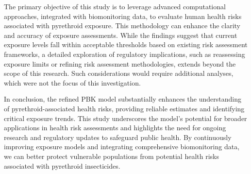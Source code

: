\documentclass[toxics,article,submit,pdftex,moreauthors]{Definitions/mdpi}
\begin{document}
The primary objective of this study is to leverage advanced computational
approaches, integrated with biomonitoring data, to evaluate human health risks
associated with pyrethroid exposure. This methodology can enhance the clarity
and accuracy of exposure assessments. While the findings suggest that current
exposure levels fall within acceptable thresholds based on existing risk
assessment frameworks, a detailed exploration of regulatory implications, such
as reassessing exposure limits or refining risk assessment methodologies,
extends beyond the scope of this research. Such considerations would require
additional analyses, which were not the focus of this investigation.

In conclusion, the refined PBK model substantially enhances the
understanding of pyrethroid-associated health risks, providing reliable
estimates and identifying critical exposure trends. This study
underscores the model's potential for broader applications in health
risk assessments and highlights the need for ongoing research and
regulatory updates to safeguard public health. By continuously improving
exposure models and integrating comprehensive biomonitoring data, we can
better protect vulnerable populations from potential health risks
associated with pyrethroid insecticides.


\vspace{6pt} 



\end{document}
